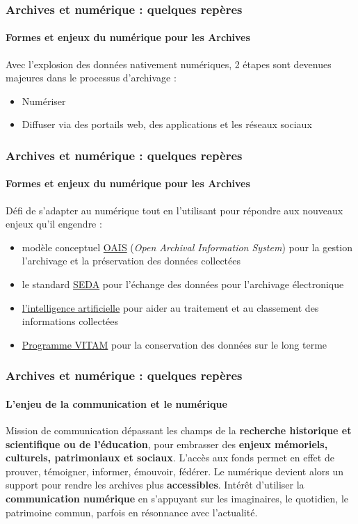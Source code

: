 \documentclass[xcolor=table]{beamer}
\begin{document}
\begin{frame}[plain]
\frametitle{Archives et num\'erique : quelques rep\`eres}
\framesubtitle{Formes et enjeux du num\'erique pour les Archives}
Avec l'explosion des donn\'ees nativement num\'eriques, 2 \'etapes sont devenues majeures dans le processus d'archivage :
\begin{itemize}
    \item Num\'eriser
    \item Diffuser via des portails web, des applications et les r\'eseaux sociaux
\end{itemize}
\end{frame}

\begin{frame}[plain]
\frametitle{Archives et num\'erique : quelques rep\`eres}
\framesubtitle{Formes et enjeux du num\'erique pour les Archives}
D\'efi de s'adapter au num\'erique tout en l'utilisant pour r\'epondre aux nouveaux enjeux qu'il engendre : 
\begin{itemize}
    \item mod\`ele conceptuel \href{https://www.cines.fr/archivage/un-concept-des-problematiques/le-modele-de-reference-loais/}{OAIS} (\textit{Open Archival Information System}) pour la gestion l'archivage et la pr\'eservation des donn\'ees collect\'ees
    \item le standard \href{https://francearchives.fr/seda/}{SEDA} pour l'\'echange des donn\'ees pour l'archivage \'electronique
    \item \href{https://nparchive.hypotheses.org/684}{l'intelligence artificielle} pour aider au traitement et au classement des informations collect\'ees
    \item  \href{https://www.programmevitam.fr/}{Programme VITAM} pour la conservation des donn\'ees sur le long terme
\end{itemize}
\end{frame}

\begin{frame}[plain]
\frametitle{Archives et num\'erique : quelques rep\`eres}
\framesubtitle{L'enjeu de la communication et le  num\'erique}
Mission de communication d\'epassant les champs de la \textbf{recherche historique et scientifique ou de l'\'education}, pour embrasser des \textbf{enjeux m\'emoriels, culturels, patrimoniaux et sociaux}. L'acc\`es aux fonds permet en effet de prouver, t\'emoigner, informer, \'emouvoir, f\'ed\'erer. Le num\'erique devient alors un support pour rendre les archives plus \textbf{accessibles}. 
\newline
\newline
Int\'er\^et d'utiliser la \textbf{communication num\'erique} en s'appuyant sur les imaginaires, le quotidien, le patrimoine commun, parfois en r\'esonnance avec l'actualit\'e. 
\end{frame}
\end{document}
